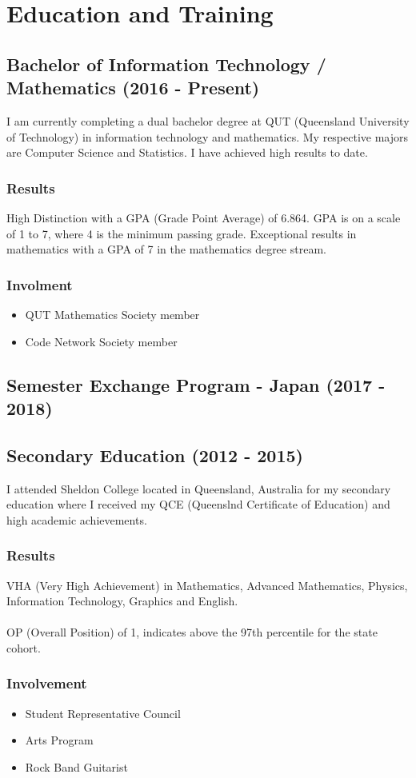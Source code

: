 \section{Education and Training}

\subsection{Bachelor of Information Technology / Mathematics (2016 - Present)}

I am currently completing a dual bachelor degree at QUT (Queensland University of Technology) in information technology and mathematics. My respective majors are Computer Science and Statistics. I have achieved high results to date.

\subsubsection{Results}

High Distinction with a GPA (Grade Point Average) of 6.864. GPA is on a scale of 1 to 7, where 4 is the minimum passing grade. Exceptional results in mathematics with a GPA of 7 in the mathematics degree stream.

\subsubsection{Involment}

\begin{itemize}
  \item QUT Mathematics Society member
  \item Code Network Society member
\end{itemize}


\subsection{Semester Exchange Program - Japan (2017 - 2018)}


\subsection{Secondary Education (2012 - 2015)}

I attended Sheldon College located in Queensland, Australia for my secondary education where I received my QCE (Queenslnd Certificate of Education) and high academic achievements.

\subsubsection{Results}
VHA (Very High Achievement) in Mathematics, Advanced Mathematics, Physics, Information Technology, Graphics and English.\\
\\
OP (Overall Position) of 1, indicates above the 97th percentile for the state cohort.

\subsubsection{Involvement}

\begin{itemize}
  \item Student Representative Council
  \item Arts Program
  \item Rock Band Guitarist
\end{itemize}

